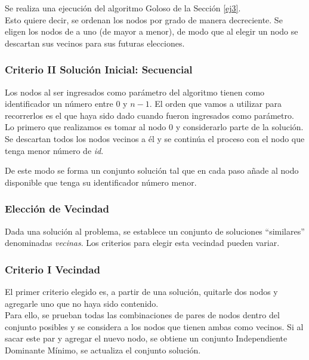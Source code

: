 Se realiza una ejecución del algoritmo Goloso de la Sección \ref{ej3}.\\

Esto quiere decir, se ordenan los nodos por grado de manera decreciente. Se eligen los nodos de a uno (de mayor a menor), de modo que al elegir un nodo se descartan sus vecinos para sus futuras elecciones.

\subsubsection*{Criterio II Solución Inicial: Secuencial}

Los nodos al ser ingresados como parámetro del algoritmo tienen como identificador un número entre $0$ y $n-1$. El orden que vamos a utilizar para recorrerlos es el que haya sido dado cuando fueron ingresados como parámetro.\\

Lo primero que realizamos es tomar al nodo $0$ y considerarlo parte de la solución. Se descartan todos los nodos vecinos a él y se continúa el proceso con el nodo que tenga menor número de \textit{id}.

De este modo se forma un conjunto solución tal que en cada paso añade al nodo disponible que tenga su identificador número menor.

\subsubsection{Elección de Vecindad}

Dada una soluci\'on al problema, se establece un conjunto de soluciones ``similares'' denominadas \emph{vecinas}. Los criterios para elegir esta vecindad pueden variar.

\subsubsection*{Criterio I Vecindad}

El primer criterio elegido es, a partir de una soluci\'on, quitarle dos nodos y agregarle uno que no haya sido contenido.\\

Para ello, se prueban todas las combinaciones de pares de nodos dentro del conjunto posibles y se considera a los nodos que tienen ambas como vecinos. Si al sacar este par y agregar el nuevo nodo, se obtiene un conjunto Independiente Dominante M\'inimo, se actualiza el conjunto soluci\'on. 


